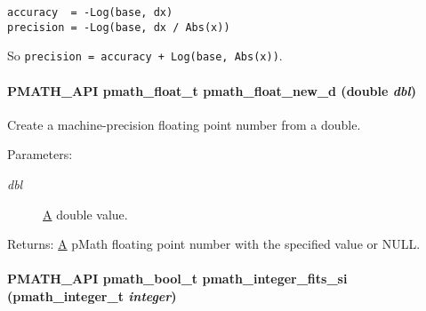 \begin{Code}\begin{verbatim}accuracy  = -Log(base, dx)
precision = -Log(base, dx / Abs(x))
\end{verbatim}
\end{Code}



So {\tt precision = accuracy + Log(base, Abs(x))}. \hypertarget{group__numbers_g5c3beb5316feb510ee46f72f11b49117}{
\paragraph[{pmath\_\-float\_\-new\_\-d}]{\setlength{\rightskip}{0pt plus 5cm}PMATH\_\-API {\bf pmath\_\-float\_\-t} pmath\_\-float\_\-new\_\-d (double {\em dbl})}\hfill}
\label{group__numbers_g5c3beb5316feb510ee46f72f11b49117}


Create a machine-precision floating point number from a double. 

\begin{Desc}
\item[Parameters:]
\begin{description}
\item[{\em dbl}]\hyperlink{class_a}{A} double value. \end{description}
\end{Desc}
\begin{Desc}
\item[Returns:]\hyperlink{class_a}{A} pMath floating point number with the specified value or NULL. \end{Desc}
\hypertarget{group__numbers_gc220e06754067b9ba4a7c823017ad32e}{
\paragraph[{pmath\_\-integer\_\-fits\_\-si}]{\setlength{\rightskip}{0pt plus 5cm}PMATH\_\-API {\bf pmath\_\-bool\_\-t} pmath\_\-integer\_\-fits\_\-si ({\bf pmath\_\-integer\_\-t} {\em integer})}\hfill}
\label{group__numbers_gc220e06754067b9ba4a7c823017ad32e}


